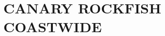 \documentclass[11pt]{book}
\begin{document}

\renewcommand*{\arraystretch}{1.1}%

\newcommand{\nSimsBase}{4,000}%
\newcommand{\cSimsBase}{1,000}%
\newcommand{\cBurnBase}{750}%
\newcommand{\nSimsSens}{2,000}%
\newcommand{\cSimsSens}{500}%
\newcommand{\cBurnSens}{250}%
\newcommand{\nChains}{8}%
\newcommand{\cSamps}{250}%
\newcommand{\Nmcmc}{2,000}%
\newcommand{\Nbase}{2,000}%


\section{CANARY ROCKFISH COASTWIDE}



\renewcommand{\startYear}{1935} %
\renewcommand{\currYear}{2023}   %
\renewcommand{\prevYear}{2022}   %
\renewcommand{\projYear}{2033}   %
\renewcommand{\pgenYear}{2108}   %
\end{document}
